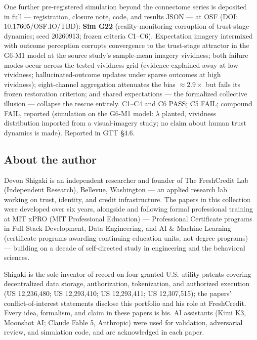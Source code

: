 \documentclass[11pt]{article}
\begin{document}
One further pre-registered simulation beyond the connectome series is
deposited in full --- registration, closure note, code, and results JSON ---
at OSF (DOI: 10.17605/OSF.IO/TBD): \textbf{Sim G22} (reality-monitoring corruption of
trust-stage dynamics; seed 20260913; frozen criteria C1--C6). Expectation
imagery intermixed with outcome perception corrupts convergence to the
trust-stage attractor in the G6-M1 model at the source study's sample-mean
imagery vividness; both failure modes occur across the tested vividness
grid (evidence explained away at low vividness; hallucinated-outcome
updates under sparse outcomes at high vividness); eight-channel aggregation
attenuates the bias $\approx$$2.9\times$ but fails its frozen restoration
criterion; and shared expectations --- the formalized collective illusion
--- collapse the rescue entirely. C1--C4 and C6 PASS; C5 FAIL; compound
FAIL, reported
(simulation on the G6-M1 model: $\lambda$ planted, vividness distribution
imported from a visual-imagery study; no claim about human trust dynamics
is made). Reported in GTT \S{}4.6.

\subsection*{About the author}

Devon Shigaki is an independent researcher and founder of The FreshCredit Lab
(Independent Research), Bellevue, Washington --- an applied research lab working
on trust, identity, and credit infrastructure. The papers in this collection
were developed over six years, alongside and following formal professional
training at MIT xPRO (MIT Professional Education) --- Professional Certificate
programs in Full Stack Development, Data Engineering, and AI \& Machine Learning
(certificate programs awarding continuing education units, not degree programs)
--- building on a decade of self-directed study in engineering and the
behavioral sciences.

Shigaki is the sole inventor of record on four granted U.S. utility patents
covering decentralized data storage, authorization, tokenization, and authorized
execution (US 12,236,480; US 12,293,410; US 12,293,411; US 12,307,515); the
papers' conflict-of-interest statements disclose this portfolio and his role at
FreshCredit. Every idea, formalism, and claim in these papers is his. AI
assistants (Kimi K3, Moonshot AI; Claude Fable 5, Anthropic) were used for
validation, adversarial review, and simulation code, and are acknowledged in
each paper.
\end{document}
